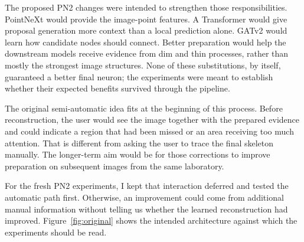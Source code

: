 \documentclass[11pt,a4paper]{article}
\newcommand{\evidence}[1]{~\cite{#1}}
\begin{document}
The proposed PN2 changes were intended to strengthen those responsibilities. PointNeXt would provide the image-point features. A Transformer would give proposal generation more context than a local prediction alone. GATv2 would learn how candidate nodes should connect. Better preparation would help the downstream models receive evidence from dim and thin processes, rather than mostly the strongest image structures. None of these substitutions, by itself, guaranteed a better final neuron; the experiments were meant to establish whether their expected benefits survived through the pipeline.\evidence{design}

The original semi-automatic idea fits at the beginning of this process. Before reconstruction, the user would see the image together with the prepared evidence and could indicate a region that had been missed or an area receiving too much attention. That is different from asking the user to trace the final skeleton manually. The longer-term aim would be for those corrections to improve preparation on subsequent images from the same laboratory.

For the fresh PN2 experiments, I kept that interaction deferred and tested the automatic path first. Otherwise, an improvement could come from additional manual information without telling us whether the learned reconstruction had improved. Figure~\ref{fig:original} shows the intended architecture against which the experiments should be read.
\end{document}
